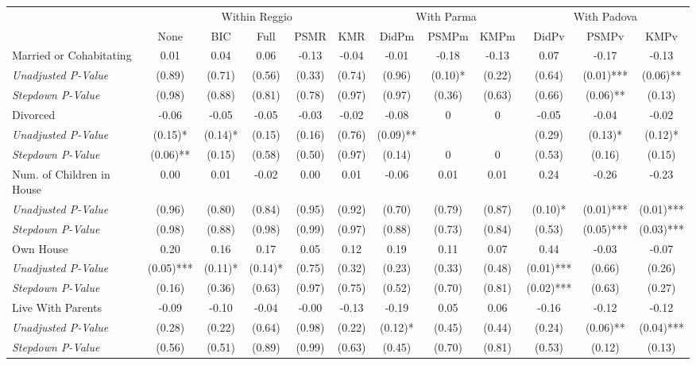 \begin{tabular}{l c c c c c c c c c c c}
\toprule
& \multicolumn{5}{c}{Within Reggio} & \multicolumn{3}{c}{With Parma} & \multicolumn{3}{c}{With Padova} \\\cmidrule(lr){2-6} \cmidrule(lr){7-9} \cmidrule(lr){10-12}
 & None & BIC & Full & PSMR & KMR & DidPm & PSMPm & KMPm & DidPv & PSMPv & KMPv \\
\midrule
Married or Cohabitating & 0.01 & 0.04 & 0.06 & -0.13 & -0.04 & -0.01 & -0.18 & -0.13 & 0.07 & -0.17 & -0.13 \\
\quad \textit{Unadjusted P-Value} & (0.89) & (0.71) & (0.56) & (0.33) & (0.74) & (0.96) & (0.10)* & (0.22) & (0.64) & (0.01)*** & (0.06)** \\
\quad \textit{Stepdown P-Value} & (0.98) & (0.88) & (0.81) & (0.78) & (0.97) & (0.97) & (0.36) & (0.63) & (0.66) & (0.06)** & (0.13) \\
Divorced & -0.06 & -0.05 & -0.05 & -0.03 & -0.02 & -0.08 & 0 & 0 & -0.05 & -0.04 & -0.02 \\
\quad \textit{Unadjusted P-Value} & (0.15)* & (0.14)* & (0.15) & (0.16) & (0.76) & (0.09)** & & & (0.29) & (0.13)* & (0.12)* \\
\quad \textit{Stepdown P-Value} & (0.06)** & (0.15) & (0.58) & (0.50) & (0.97) & (0.14) & 0 & 0 & (0.53) & (0.16) & (0.15) \\
Num. of Children in House & 0.00 & 0.01 & -0.02 & 0.00 & 0.01 & -0.06 & 0.01 & 0.01 & 0.24 & -0.26 & -0.23 \\
\quad \textit{Unadjusted P-Value} & (0.96) & (0.80) & (0.84) & (0.95) & (0.92) & (0.70) & (0.79) & (0.87) & (0.10)* & (0.01)*** & (0.01)*** \\
\quad \textit{Stepdown P-Value} & (0.98) & (0.88) & (0.98) & (0.99) & (0.97) & (0.88) & (0.73) & (0.84) & (0.53) & (0.05)*** & (0.03)*** \\
Own House & 0.20 & 0.16 & 0.17 & 0.05 & 0.12 & 0.19 & 0.11 & 0.07 & 0.44 & -0.03 & -0.07 \\
\quad \textit{Unadjusted P-Value} & (0.05)*** & (0.11)* & (0.14)* & (0.75) & (0.32) & (0.23) & (0.33) & (0.48) & (0.01)*** & (0.66) & (0.26) \\
\quad \textit{Stepdown P-Value} & (0.16) & (0.36) & (0.63) & (0.97) & (0.75) & (0.52) & (0.70) & (0.81) & (0.02)*** & (0.63) & (0.27) \\
Live With Parents & -0.09 & -0.10 & -0.04 & -0.00 & -0.13 & -0.19 & 0.05 & 0.06 & -0.16 & -0.12 & -0.12 \\
\quad \textit{Unadjusted P-Value} & (0.28) & (0.22) & (0.64) & (0.98) & (0.22) & (0.12)* & (0.45) & (0.44) & (0.24) & (0.06)** & (0.04)*** \\
\quad \textit{Stepdown P-Value} & (0.56) & (0.51) & (0.89) & (0.99) & (0.63) & (0.45) & (0.70) & (0.81) & (0.53) & (0.12) & (0.13) \\
\bottomrule
\end{tabular}
